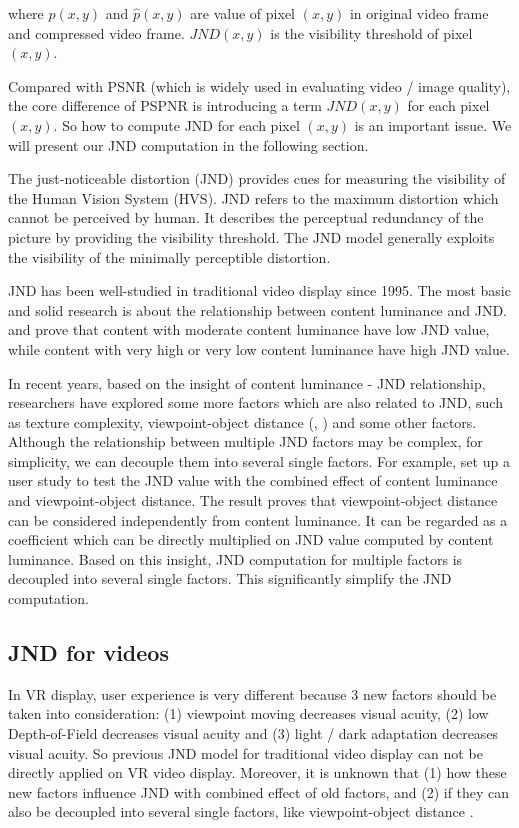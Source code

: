 where $p(x, y)$ and $\hat{p}(x, y)$ are value of pixel $(x, y)$ in original video frame and compressed video frame. $JND(x, y)$ is the visibility threshold of pixel $(x, y)$.

Compared with PSNR (which is widely used in evaluating video / image quality), the core difference of PSPNR is introducing a term $JND(x, y)$ for each pixel $(x, y)$. So how to compute JND for each pixel $(x, y)$ is an important issue. We will present our JND computation in the following section.

The just-noticeable distortion (JND) provides cues for measuring the visibility of the Human Vision System (HVS). JND refers to the maximum distortion which cannot be perceived by human. It describes the perceptual redundancy of the picture by providing the visibility threshold. The JND model generally exploits the visibility of the minimally perceptible distortion.

JND has been well-studied in traditional video display since 1995. The most basic and solid research is about the relationship between content luminance and JND. \cite{luminance1}  and \cite{PSPNR} prove that content with moderate content luminance have low JND value, while content with very high or very low content luminance have high JND value. 


In recent years, based on the insight of content luminance - JND relationship, researchers have explored some more factors which are also related to JND, such as texture complexity, viewpoint-object distance (\cite{PSPNR}, \cite{distance}) and some other factors. Although the relationship between multiple JND factors may be complex, for simplicity, we can decouple them into several single factors. For example, \cite{distance} set up a user study to test the JND value with the combined effect of content luminance and viewpoint-object distance. The result proves that viewpoint-object distance can be considered independently from content luminance. It can be regarded as a coefficient which can be directly multiplied on JND value computed by content luminance. Based on this insight, JND computation for multiple factors is decoupled into several single factors. This significantly simplify the JND computation.

\subsection{JND for \vr videos}
\label{subsec:jnd:framework}


In VR display, user experience is very different because 3 new factors should be taken into consideration: (1) viewpoint moving decreases visual acuity, (2) low Depth-of-Field decreases visual acuity and (3) light / dark adaptation decreases visual acuity. So previous JND model for traditional video display can not be directly applied on VR video display. Moreover, it is unknown that (1) how these new factors influence JND with combined effect of old factors, and (2) if they can also be decoupled into several single factors, like viewpoint-object distance \cite{distance}.


